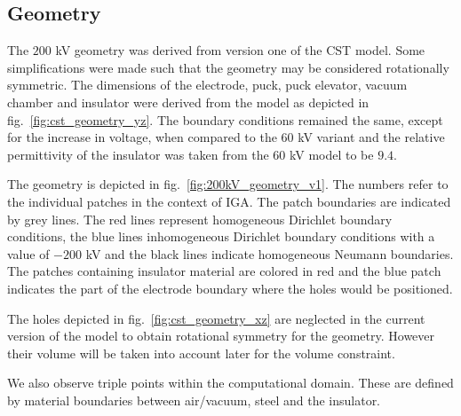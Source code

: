 \subsection{Geometry}
The $200$ kV geometry was derived from version one of the CST model. Some simplifications were made such that the geometry may be considered rotationally symmetric. The dimensions of the electrode, puck, puck elevator, vacuum chamber and insulator were derived from the model as depicted in fig.~\ref{fig:cst_geometry_yz}. The boundary conditions remained the same, except for the increase in voltage, when compared to the $60$ kV variant and the relative permittivity of the insulator was taken from the $60$ kV model to be $9.4$.

The geometry is depicted in fig.~\ref{fig:200kV_geometry_v1}. The numbers refer to the individual patches in the context of IGA. The patch boundaries are indicated by grey lines. The red lines represent homogeneous Dirichlet boundary conditions, the blue lines inhomogeneous Dirichlet boundary conditions with a value of $-200$ kV and the black lines indicate homogeneous Neumann boundaries.
The patches containing insulator material are colored in red and the blue patch indicates the part of the electrode boundary where the holes would be positioned.

The holes depicted in fig.~\ref{fig:cst_geometry_xz} are neglected in the current version of the model to obtain rotational symmetry for the geometry. However their volume will be taken into account later for the volume constraint.

We also observe triple points within the computational domain. These are defined by material boundaries between air/vacuum, steel and the insulator.

